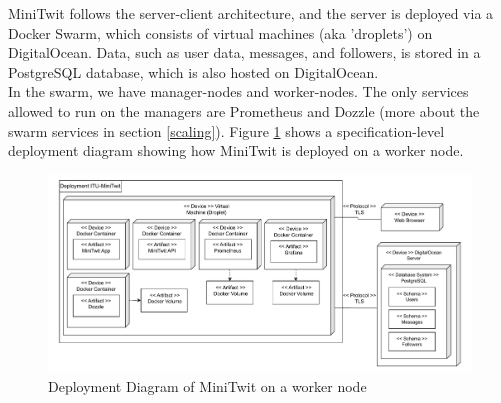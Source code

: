 MiniTwit follows the server-client architecture, and the server is deployed via a Docker Swarm, which consists of virtual machines (aka 'droplets') on DigitalOcean. Data, such as user data, messages, and followers, is stored in a PostgreSQL database, which is also hosted on DigitalOcean. \\
In the swarm, we have manager-nodes and worker-nodes. The only services allowed to run on the managers are Prometheus and Dozzle (more about the swarm services in section \ref{scaling}). Figure \ref{fig:DeployDiagram} shows a specification-level deployment diagram showing how MiniTwit is deployed on a worker node.
\begin{figure}[h]
\centering
\includegraphics[scale=0.5, center]{images/DeployUMLDraft(1).pdf}
\caption{Deployment Diagram of MiniTwit on a worker node}
\label{fig:DeployDiagram}
\end{figure}